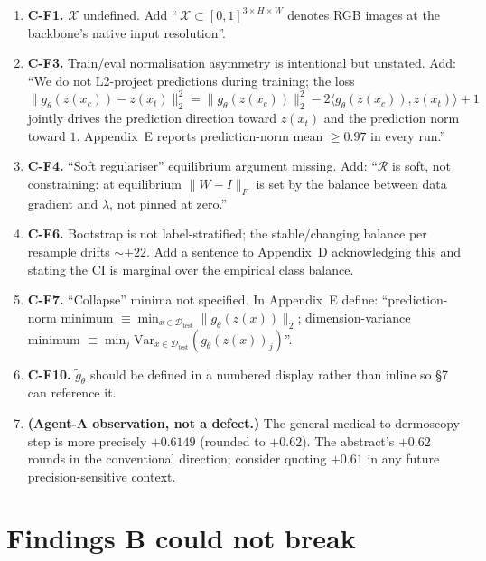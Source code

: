 \documentclass[11pt,a4paper]{article}
\begin{document}
\begin{enumerate}[leftmargin=2em]
\item \textbf{C-F1.} $\mathcal{X}$ undefined. Add ``\,$\mathcal{X}
      \subset [0, 1]^{3 \times H \times W}$ denotes RGB images at the
      backbone's native input resolution''.
\item \textbf{C-F3.} Train/eval normalisation asymmetry is intentional
      but unstated. Add: ``We do not L2-project predictions during
      training; the loss
      $\|g_\theta(z(x_c)) - z(x_t)\|_2^2 = \|g_\theta(z(x_c))\|_2^2 -
      2\langle g_\theta(z(x_c)), z(x_t)\rangle + 1$ jointly drives the
      prediction direction toward $z(x_t)$ and the prediction norm
      toward $1$. Appendix~E reports prediction-norm mean $\geq 0.97$
      in every run.''
\item \textbf{C-F4.} ``Soft regulariser'' equilibrium argument missing.
      Add: ``$\mathcal{R}$ is soft, not constraining: at equilibrium
      $\|W - I\|_F$ is set by the balance between data gradient and
      $\lambda$, not pinned at zero.''
\item \textbf{C-F6.} Bootstrap is not label-stratified; the
      stable/changing balance per resample drifts $\sim \pm 22$. Add a
      sentence to Appendix~D acknowledging this and stating the CI is
      marginal over the empirical class balance.
\item \textbf{C-F7.} ``Collapse'' minima not specified. In Appendix~E
      define: ``prediction-norm minimum $\equiv \min_{x \in
      \mathcal{D}_{\mathrm{test}}} \|g_\theta(z(x))\|_2$;
      dimension-variance minimum $\equiv \min_{j} \mathrm{Var}_{x \in
      \mathcal{D}_{\mathrm{test}}}(g_\theta(z(x))_j)$''.
\item \textbf{C-F10.} $\tilde g_\theta$ should be defined in a numbered
      display rather than inline so \S7 can reference it.
\item \textbf{(Agent-A observation, not a defect.)} The
      general-medical-to-dermoscopy step is more precisely $+0.6149$
      (rounded to $+0.62$). The abstract's $+0.62$ rounds in the
      conventional direction; consider quoting $+0.61$ in any future
      precision-sensitive context.
\end{enumerate}

\section{Findings B could not break}
\end{document}
